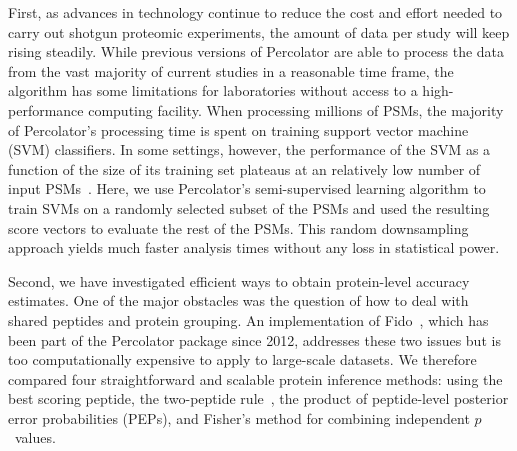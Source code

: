 \documentclass{article}
\begin{document}
First, as advances in technology continue to reduce the cost and
effort needed to carry out shotgun proteomic experiments, the amount
of data per study will keep rising steadily. While previous versions
of Percolator are able to process the data from the vast majority of
current studies in a reasonable time frame, the algorithm has some
limitations for laboratories without access to a high-performance
computing facility. When processing millions of PSMs, the majority of
Percolator's processing time is spent on training support vector
machine (SVM) classifiers.  In some settings, however, the performance
of the SVM as a function of the size of its training set plateaus at
an relatively low number of input PSMs~\cite{gonnelli2015decoy}. Here,
we use Percolator's semi-supervised learning algorithm to train SVMs
on a randomly selected subset of the PSMs and used the resulting score
vectors to evaluate the rest of the PSMs.  This random downsampling
approach yields much faster analysis times without any loss in
statistical power.

Second, we have investigated efficient ways to obtain protein-level 
accuracy estimates. One of the major obstacles was the question of how 
to deal with shared peptides and protein grouping. An implementation 
of Fido~\cite{serang2010efficient}, which has been part of the 
Percolator package since 2012, addresses these two issues but is too 
computationally expensive to apply to large-scale datasets. We 
therefore compared four straightforward and scalable protein inference 
methods: using the best scoring peptide, the two-peptide 
rule~\cite{carr2004need, gupta2009false}, the product of 
peptide-level posterior error probabilities (PEPs), and Fisher's 
method for combining independent $p$~values.
\end{document}
